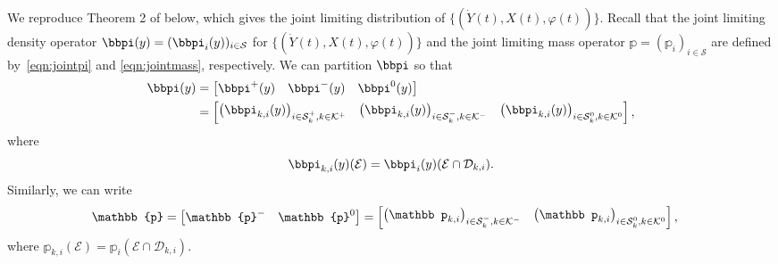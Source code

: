 We reproduce Theorem 2 of \cite{bo2014} below, which gives the joint limiting distribution of $\{(\dot Y(t),X(t),  \varphi(t))\}$. Recall that the joint limiting density operator ${\bbpi}(y) = (\bbpi_i(y))_{i \in \mathcal{S}}$ for $\{(\dot Y(t), X(t), \varphi(t))\}$ and the joint limiting mass operator ${\mathbb p} = (\mathbb p_i)_{i \in \mathcal{S}}$ are defined by~\eqref{eqn:jointpi} and \eqref{eqn:jointmass}, respectively. %
We can partition \(\bbpi\) so that 
% 
	\begin{align*} 
		\bbpi(y) &= \vligne{\bbpi^{+}(y) & \bbpi^{-}(y) & \bbpi^{0}(y)} 
		\\&= \vligne{\left(\bbpi_{k,i}(y)\right)_{i \in \mathcal{S}_k^+,k\in\mathcal K^+} & \left(\bbpi_{k,i}(y)\right)_{i \in \mathcal{S}_k^-,k\in\mathcal K^-} & \left(\bbpi_{k,i}(y)\right)_{i \in \mathcal{S}_k^0,k\in\mathcal K^0}},
	\end{align*} 
	where  
% 
	\begin{align*} 
		\bbpi_{k,i}(y)(\mathcal{E}) = \bbpi_i(y)(\mathcal{E}\cap \mathcal D_{k,i}).
	\end{align*} 
%
Similarly, we can write 
	\begin{align*} 
		\mathbb{p} &= \vligne{\mathbb{p}^{-} & \mathbb{p}^{0}} 
		= \vligne{\left(\mathbb p_{k,i}\right)_{i \in \mathcal{S}_k^-,k\in\mathcal K^-}  & \left(\mathbb p_{k,i}\right)_{i \in \mathcal{S}_k^0,k\in\mathcal K^0} },
	\end{align*} 
	where  
% 
	\( 
		\mathbb p_{k,i}(\mathcal{E}) = \mathbb p_i(\mathcal{E}\cap \mathcal D_{k,i}).
	\) 
%
